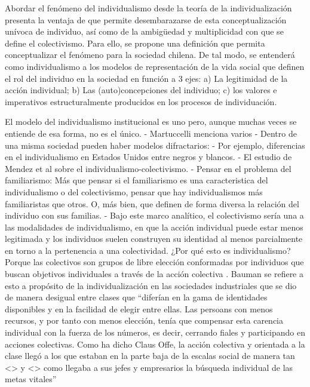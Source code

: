 \documentclass[12pt,twoside]{templates/facsothesis}
\begin{document}
Abordar el fenómeno del individualismo desde la teoría de la individualización presenta la ventaja de que permite desembarazarse de esta conceptualización unívoca de individuo, así como de la ambigüedad y multiplicidad con que se define el colectivismo. Para ello, se propone una definición que permita conceptualizar el fenómeno para la sociedad chilena. De tal modo, se entenderá como individualismo a los modelos de representación de la vida social que definen el rol del individuo en la sociedad en función a 3 ejes: a) La legitimidad de la acción individual; b) Las (auto)concepciones del individuo; c) los valores e imperativos estructuralmente producidos en los procesos de individuación.

El modelo del individualismo institucional es uno pero, aunque muchas veces se entiende de esa forma, no es el único.
- Martuccelli menciona varios
- Dentro de una misma sociedad pueden haber modelos difractarios:
- Por ejemplo, diferencias en el individualismo en Estados Unidos entre negros y blancos.
- El estudio de Mendez et al sobre el individualismo-colectivismo.
- Pensar en el problema del familiarismo: Más que pensar si el familiarismo es una caracteristica del individualismo o del colectivismo, pensar que hay individualismos más familiaristas que otros. O, más bien, que definen de forma diversa la relación del individuo con sus familias.
- Bajo este marco analítico, el colectivismo sería una a las modalidades de individualismo, en que la acción individual puede estar menos legitimada y los individuos suelen construyen su identidad al menos parcialmente en torno a la pertenencia a una colectividad. ¿Por qué esto es individualismo? Porque las colectivos son grupos de libre elección conformadas por individuos que buscan objetivos individuales a través de la acción colectiva \citep{arribas1999}. Bauman se refiere a esto a propósito de la individualización en las sociedades industriales que se dio de manera desigual entre clases que ``diferían en la gama de identidades disponibles y en la facilidad de elegir entre ellas. Las persoans con menos recursos, y por tanto con menos elección, tenía que compensar esta carencia individual con la fuerza de los números, es decir, cerrando fiales y participando en acciones colectivas. Como ha dicho Claus Offe, la acción colectiva y orientada a la clase llegó a los que estaban en la parte baja de la escalas social de manera tan \textless{}\textgreater{} y \textless{}\textgreater{} como llegaba a sus jefes y empresarios la búsqueda individual de las metas vitales'' \citep[p.~23]{bauman2003}
\end{document}
